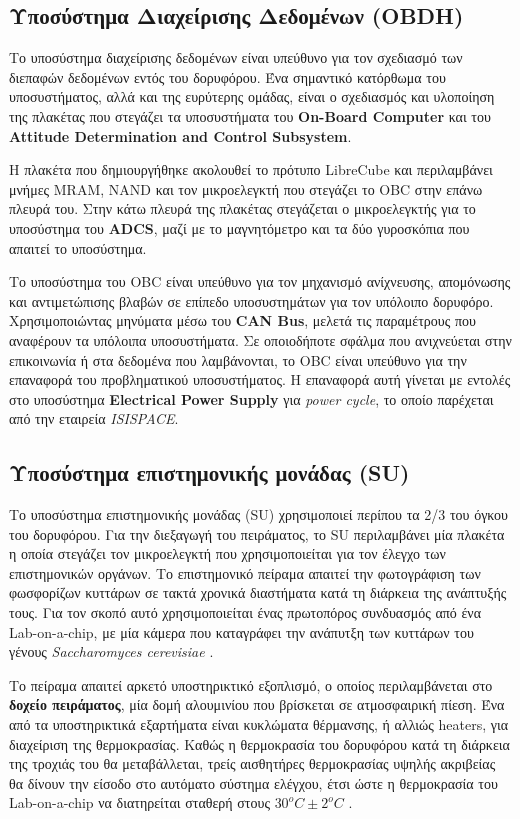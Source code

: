 \documentclass[a4paper,nobib,justified]{tufte-book}
\begin{document}
\subsection{Υποσύστημα Διαχείρισης Δεδομένων (\acs{OBDH})}
Το υποσύστημα διαχείρισης δεδομένων είναι υπεύθυνο για τον σχεδιασμό των διεπαφών δεδομένων εντός του δορυφόρου. Ένα σημαντικό κατόρθωμα του υποσυστήματος, αλλά και της ευρύτερης ομάδας, είναι ο σχεδιασμός και υλοποίηση της πλακέτας που στεγάζει τα υποσυστήματα του \textbf{On-Board Computer} και του \textbf{Attitude Determination and Control Subsystem}.

Η πλακέτα που δημιουργήθηκε ακολουθεί το πρότυπο LibreCube και περιλαμβάνει μνήμες MRAM, NAND και τον μικροελεγκτή που στεγάζει το OBC στην επάνω πλευρά του. Στην κάτω πλευρά της πλακέτας στεγάζεται ο μικροελεγκτής για το υποσύστημα του \textbf{ADCS}, μαζί με το μαγνητόμετρο και τα δύο γυροσκόπια που απαιτεί το υποσύστημα.

Το υποσύστημα του OBC είναι υπεύθυνο για τον μηχανισμό ανίχνευσης, απομόνωσης και αντιμετώπισης βλαβών σε επίπεδο υποσυστημάτων για τον υπόλοιπο δορυφόρο. Χρησιμοποιώντας μηνύματα μέσω του \textbf{CAN Bus}, μελετά τις παραμέτρους που αναφέρουν τα υπόλοιπα υποσυστήματα. Σε οποιοδήποτε σφάλμα που ανιχνεύεται στην επικοινωνία ή στα δεδομένα που λαμβάνονται, το OBC είναι υπεύθυνο για την επαναφορά του προβληματικού υποσυστήματος. Η επαναφορά αυτή γίνεται με εντολές στο υποσύστημα \textbf{Electrical Power Supply} για \emph{power cycle}, το οποίο παρέχεται από την εταιρεία \emph{ISISPACE}.

\subsection{Υποσύστημα επιστημονικής μονάδας (\acs{SU})}

Το υποσύστημα επιστημονικής μονάδας (SU) χρησιμοποιεί περίπου τα 2/3 του όγκου του δορυφόρου. Για την διεξαγωγή του πειράματος, το \acs{SU} περιλαμβάνει μία πλακέτα η οποία στεγάζει τον μικροελεγκτή που χρησιμοποιείται για τον έλεγχο των επιστημονικών οργάνων. Το επιστημονικό πείραμα απαιτεί την φωτογράφιση των φωσφορίζων κυττάρων σε τακτά χρονικά διαστήματα κατά τη διάρκεια της ανάπτυξής τους. Για τον σκοπό αυτό χρησιμοποιείται ένας πρωτοπόρος συνδυασμός από ένα Lab-on-a-chip, με μία κάμερα που καταγράφει την ανάπυτξη των κυττάρων του γένους \textit{Saccharomyces cerevisiae} .

Το πείραμα απαιτεί αρκετό υποστηρικτικό εξοπλισμό, ο οποίος περιλαμβάνεται στο \textbf{δοχείο πειράματος}, μία δομή αλουμινίου που βρίσκεται σε ατμοσφαιρική πίεση. Ένα από τα υποστηρικτικά εξαρτήματα είναι κυκλώματα θέρμανσης, ή αλλιώς heaters, για διαχείριση της θερμοκρασίας. Καθώς η θερμοκρασία του δορυφόρου κατά τη διάρκεια της τροχιάς του θα μεταβάλλεται, τρείς αισθητήρες θερμοκρασίας υψηλής ακριβείας θα δίνουν την είσοδο στο αυτόματο σύστημα ελέγχου, έτσι ώστε η θερμοκρασία του Lab-on-a-chip να διατηρείται σταθερή στους $30^o C \pm 2^oC$ .
\end{document}
